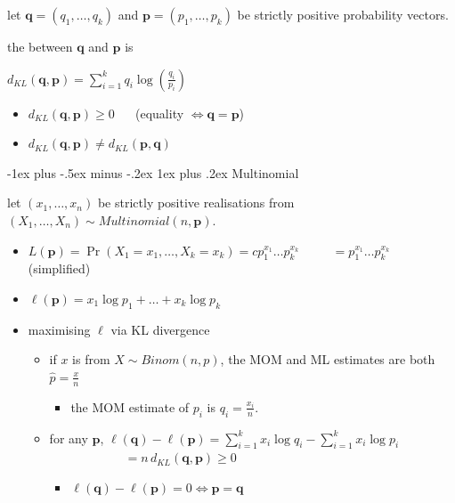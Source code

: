 \documentclass[10pt, landscape]{article}
\makeatletter
\renewcommand{\subsubsection}{\@startsection{subsubsection}{3}{0mm}%
  {-1ex plus -.5ex minus -.2ex}%
  {1ex plus .2ex}%
{\normalfont\small\bfseries}}%
\newcommand{\seq}[2][n]{#2_1, \dots, #2_{#1}}
\makeatother
\begin{document}
\begin{multicols*}{4}
  let $\mathbf{q} = (\seq[k]{q})$ and $\mathbf{p} = (\seq[k]{p})$ be strictly positive probability vectors.

  \begin{tightcenter}
    the  between $\mathbf{q}$ and $\mathbf{p}$ is

    \( {\displaystyle{ d_{KL}(\mathbf{q}, \mathbf{p}) = \sum^k_{i=1}q_i \log (\frac{q_i}{p_i}) }} \) 
  \end{tightcenter}

  \begin{itemize}
    \item $d_{KL}(\mathbf{q}, \mathbf{p}) \geq 0$ $\quad$ 
      (equality $\iff \mathbf{q} = \mathbf{p}$)
    \item $d_{KL}(\mathbf{q}, \mathbf{p}) \neq d_{KL}(\mathbf{p}, \mathbf{q})$ 
  \end{itemize}

  \subsubsection{Multinomial}

  let $(\seq{x})$ be strictly positive realisations from $(\seq{X}) \sim Multinomial(n, \mathbf{p})$. 

  \begin{itemize}
    \item $L(\mathbf{p}) = \Pr (X_1=x_1, \dots, X_k = x_k) = cp_1^{x_1} \dots p_k^{x_k}$
      $\qquad\; = p_1^{x_1} \dots p_k^{x_k}$ (simplified)
    \item $\ell (\mathbf{p}) = x_1 \log p_1 + \dots + x_k \log p_k$
    \item maximising $\ell$ via KL divergence
      \begin{itemize}
        \item if $x$ is from $X \sim Binom(n, p)$, the MOM and ML estimates are both $\hat p = \frac{x}{n}$ 
          \begin{itemize}
            \item the MOM estimate of $p_i$ is $q_i = \frac{x_i}{n}$. 
          \end{itemize}
        \item for any $\mathbf{p}$, $\ell(\mathbf{q}) - \ell(\mathbf{p}) = \sum^k_{i=1}x_i \log q_i - \sum^k_{i=1} x_i \log p_i$ 
          $\qquad\qquad\qquad = n \, d_{KL}(\mathbf{q}, \mathbf{p}) \geq 0$
          \begin{itemize}
            \item $\ell(\mathbf{q}) - \ell(\mathbf{p}) = 0 \iff \mathbf{p} = \mathbf{q}$
          \end{itemize}
      \end{itemize}
  \end{itemize}


\end{multicols*}
\end{document}
